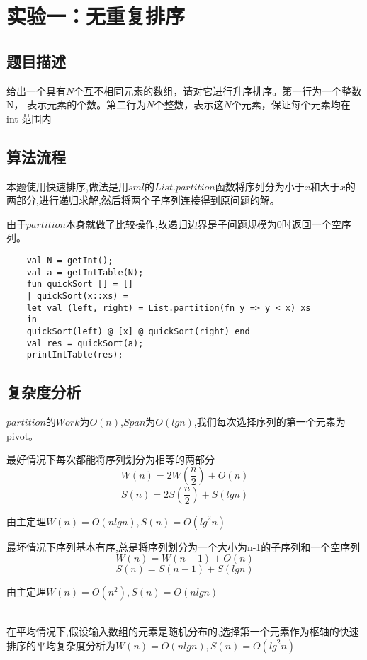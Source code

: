 \documentclass[UTF8,a4paperdui, %
]{ctexart}
\begin{document}
\newpage
\newcommand*{\calF}{\mathcal{F}}
\newcommand*{\calH}{\mathcal{H}}
\newcommand*{\vx}{\bm x}
\newcommand*{\vy}{\bm y}
\newcommand*{\vh}{\bm h}
\newcommand{\Figure}[2]{
\begin{figure}[htbp]
\centering
\texttt{[image: \#2]}
\end{figure}
}

\setcounter{tocdepth}{1}
\tableofcontents

\newpage
\section{实验一：无重复排序}

\subsection{题目描述}
给出一个具有$ N $个互不相同元素的数组，请对它进行升序排序。第一行为一个整数 N，
表示元素的个数。第二行为$ N $个整数，表示这$ N $个元素，保证每个元素均在 int 范围内

\subsection{算法流程}
本题使用快速排序,做法是用$sml$的$List.partition$函数将序列分为小于$x$和大于$x$的两部分,进行递归求解,然后将两个子序列连接得到原问题的解。
\par 由于$partition$本身就做了比较操作,故递归边界是子问题规模为0时返回一个空序列。

\begin{lstlisting}
    val N = getInt();
    val a = getIntTable(N);
    fun quickSort [] = []
    | quickSort(x::xs) =
    let val (left, right) = List.partition(fn y => y < x) xs
    in
    quickSort(left) @ [x] @ quickSort(right) end
    val res = quickSort(a);
    printIntTable(res);
\end{lstlisting}

\subsection{复杂度分析}
$partition$的$Work$为$O(n)$,$Span$为$O(lgn)$,我们每次选择序列的第一个元素为pivot。
\par 最好情况下每次都能将序列划分为相等的两部分
$$W(n)=2W(\frac{n}{2})+O(n)$$
$$S(n)=2S(\frac{n}{2})+S(lgn)$$
\par 由主定理$W(n)=O(nlgn),S(n)=O({lg}^2n)$

\par 最坏情况下序列基本有序,总是将序列划分为一个大小为n-1的子序列和一个空序列
$$W(n)=W(n-1)+O(n)$$
$$S(n)=S(n-1)+S(lgn)$$
\par 由主定理$W(n)=O(n^2),S(n)=O(nlgn)$
\\\
\par  在平均情况下,假设输入数组的元素是随机分布的,选择第一个元素作为枢轴的快速排序的平均复杂度分析为$W(n)=O(nlgn),S(n)=O({lg}^2n)$
\end{document}
